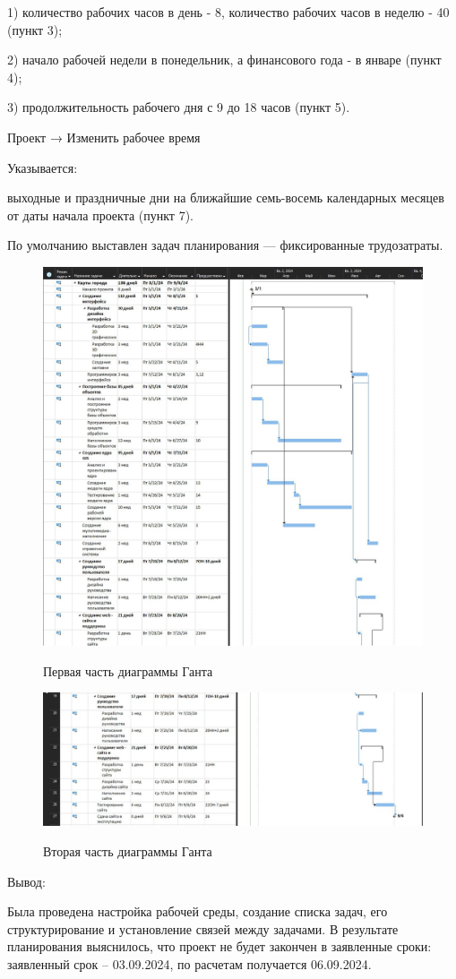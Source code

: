 1) количество рабочих часов в день - 8, количество рабочих часов в неделю - 40 (пункт 3);

2) начало рабочей недели в понедельник, а финансового года - в январе (пункт 4);

3) продолжительность рабочего дня с 9 до 18 часов (пункт 5).	

Проект → Изменить рабочее время

Указывается:

выходные и праздничные дни на ближайшие семь-восемь календарных месяцев от даты начала проекта (пункт 7).

По умолчанию выставлен задач планирования --- фиксированные трудозатраты.


\begin{figure}[ht!]
	\includegraphics[width=0.75\linewidth]{assets/images/res1.jpg}
	\label{fig:r2}
	\caption{Первая часть диаграммы Ганта}
\end{figure}
\FloatBarrier
\begin{figure}[ht!]
	\includegraphics[width=0.75\linewidth]{assets/images/res2.jpg}
	\label{fig:r2}
	\caption{Вторая часть диаграммы Ганта}
\end{figure}
\FloatBarrier
Вывод:

Была проведена настройка рабочей среды, создание списка задач, его структурирование и установление связей между задачами.
В результате планирования выяснилось, что проект не будет закончен в заявленные сроки: заявленный срок – 03.09.2024, по расчетам получается 06.09.2024.